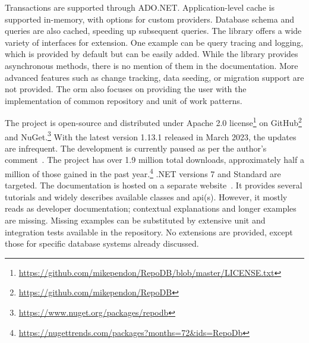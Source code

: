Transactions are supported through ADO.NET. Application-level cache is supported in-memory, with options for custom providers. Database schema and queries are also cached, speeding up subsequent queries. The library offers a wide variety of interfaces for extension. One example can be query tracing and logging, which is provided by default but can be easily added. While the library provides asynchronous methods, there is no mention of them in the documentation. More advanced features such as change tracking, data seeding, or migration support are not provided. The \acrshort{orm} also focuses on providing the user with the implementation of common repository and unit of work patterns.

The project is open-source and distributed under Apache 2.0 license\footnote{\url{https://github.com/mikependon/RepoDB/blob/master/LICENSE.txt}} on GitHub\footnote{\url{https://github.com/mikependon/RepoDB}} and NuGet.\footnote{\url{https://www.nuget.org/packages/repodb}} With the latest version 1.13.1 released in March 2023, the updates are infrequent. The development is currently paused as per the author's comment~\cite{PendonRepoDBComment}. The project has over 1.9 million total downloads, approximately half a million of those gained in the past year.\footnote{\url{https://nugettrends.com/packages?months=72&ids=RepoDb}} .NET versions 7 and Standard are targeted. The documentation is hosted on a separate website~\cite{RepoDB}. It provides several tutorials and widely describes available classes and \acrshort{api}(s). However, it mostly reads as developer documentation; contextual explanations and longer examples are missing. Missing examples can be substituted by extensive unit and integration tests available in the repository. No extensions are provided, except those for specific database systems already discussed.


